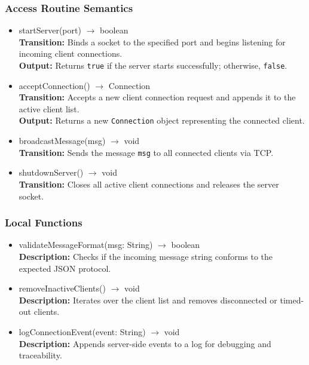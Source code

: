 \documentclass[12pt, titlepage]{article}
\begin{document}
\subsubsection{Access Routine Semantics}

\begin{itemize}
    \item startServer(port) $\rightarrow$ boolean\\
    \textbf{Transition:} Binds a socket to the specified port and begins listening for incoming client connections.\\
    \textbf{Output:} Returns \texttt{true} if the server starts successfully; otherwise, \texttt{false}.

    \item acceptConnection() $\rightarrow$ Connection\\
    \textbf{Transition:} Accepts a new client connection request and appends it to the active client list.\\
    \textbf{Output:} Returns a new \texttt{Connection} object representing the connected client.

    \item broadcastMessage(msg) $\rightarrow$ void\\
    \textbf{Transition:} Sends the message \texttt{msg} to all connected clients via TCP.

    \item shutdownServer() $\rightarrow$ void\\
    \textbf{Transition:} Closes all active client connections and releases the server socket.
\end{itemize}

\subsubsection{Local Functions}

\begin{itemize}
    \item validateMessageFormat(msg: String) $\rightarrow$ boolean\\
    \textbf{Description:} Checks if the incoming message string conforms to the expected JSON protocol.

    \item removeInactiveClients() $\rightarrow$ void\\
    \textbf{Description:} Iterates over the client list and removes disconnected or timed-out clients.

    \item logConnectionEvent(event: String) $\rightarrow$ void\\
    \textbf{Description:} Appends server-side events to a log for debugging and traceability.
\end{itemize}
\end{document}
